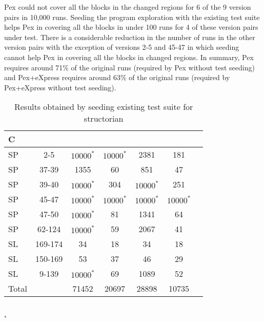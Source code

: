 Pex could not cover all the blocks in the changed regions for 6 of the 9 version pairs in 10,000 runs. Seeding the program exploration with the existing test suite helps Pex in covering all the blocks in under 100 runs for 4 of these version pairs under test. There is a considerable reduction in the number of runs in the other version pairs with the exception of versions 2-5 and 45-47 in which seeding cannot help Pex in covering all the blocks in changed regions. In summary, Pex requires around 71\% of the original runs (required by Pex without test seeding) and Pex+eXpress requires around 63\% of the original runs (required by Pex+eXpress without test seeding).


\begin{table}
\begin{CodeOut}
\begin{center}
\caption {\label{table:rq5}\scriptsize{Results obtained by seeding existing test suite for structorian}}
\begin {tabular} {|l|c|c|c|c|c|c|}
\hline
C & \CenterCell{V} &\CenterCell{$N_{Pex}$}&\CenterCell{$Np_{seed}$} &\CenterCell{$N_{eXpress}$} &\CenterCell{$Ne_{seed}$}\\

\hline
SP&2-5&$10000^*$&$10000^*$&2381&181\\
\hline
SP&37-39&1355&60&851&47\\
\hline
SP&39-40&$10000^*$&304&$10000^*$&251\\
\hline
SP&45-47&$10000^*$&$10000^*$&$10000^*$&$10000^*$\\
\hline
SP&47-50&$10000^*$&81&1341&64\\
\hline
SP&62-124&$10000^*$&59&2067&41\\
\hline
SL&169-174&34&18&34&18\\
\hline
SL&150-169&53&37&46&29\\
\hline
SL&9-139&$10000^*$&69&1089&52\\
\hline
Total&&71452&20697&28898&10735\\
\hline
\end{tabular}\\
$^*$ 
\end{center}
\end{CodeOut}
\vspace{- 0.4 in}
\end{table}


